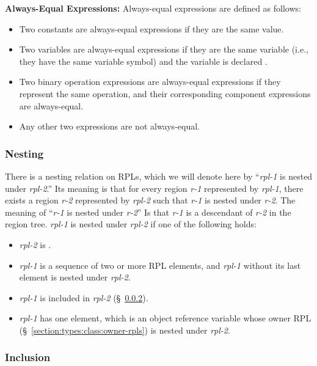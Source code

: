 \noindent
\textbf{Always-Equal Expressions:} Always-equal expressions are
defined as follows:
%
\begin{itemize}
%
\item Two constants are always-equal expressions if they are the same
  value.
%
\item Two variables are always-equal expressions if they are the same
  variable (i.e., they have the same variable symbol) and the variable
  is declared .
%
\item Two binary operation expressions are always-equal expressions if
  they represent the same operation, and their corresponding component
  expressions are always-equal.
%
\item Any other two expressions are not always-equal.
%
\end{itemize}


\subsubsection{Nesting}
\label{section:rpls:relations:nesting}

There is a nesting relation on RPLs, which we will denote here by
``\emph{rpl-1} is nested under \emph{rpl-2}.''  Its meaning is that
for every region \emph{r-1} represented by \emph{rpl-1}, there exists
a region \emph{r-2} represented by \emph{rpl-2} such that \emph{r-1}
is nested under \emph{r-2}.  The meaning of ``\emph{r-1} is nested
under \emph{r-2}'' Is that \emph{r-1} is a descendant of \emph{r-2} in
the region tree.
%
\emph{rpl-1} is nested under \emph{rpl-2} if one of the following holds:
%
\begin{itemize}
%
\item \emph{rpl-2} is .
%
\item \emph{rpl-1} is a sequence of two or more RPL elements, and
  \emph{rpl-1} without its last element is nested under \emph{rpl-2}.
%
\item \emph{rpl-1} is included in \emph{rpl-2}
  (\S~\ref{section:rpls:relations:inclusion}).
%
\item \emph{rpl-1} has one element, which is an object reference
  variable whose owner RPL (\S~\ref{section:types:class:owner-rpls}) is
  nested under \emph{rpl-2}.
%
\end{itemize}


\subsubsection{Inclusion}
\label{section:rpls:relations:inclusion}

